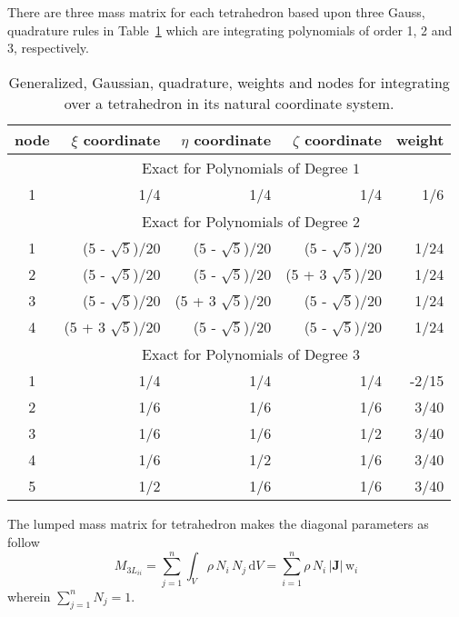 There are three mass matrix for each tetrahedron based upon three Gauss, quadrature rules in Table~\ref{tabQuadraturetetra} which are integrating polynomials of order 1, 2 and 3, respectively. 

\begin{table}
    \centering
    \begin{tabular}{|c|rrrr|}
        \hline
        node & \centering $\xi$ coordinate \phantom{1234}  & 
        $\eta$ coordinate \phantom{1234} & 
        $\zeta$ coordinate \phantom{1234} & weight \phantom{12345} \\ \hline        
        & \multicolumn{4}{|c|}{Exact for Polynomials of Degree $1^{\phantom{|^|}}$} \\ 
        \hline
        1 & 1/4 & 1/4 & 1/4 & 1/6 \\ 
        \hline
        & \multicolumn{4}{|c|}{Exact for Polynomials of Degree $2^{\phantom{|^|}}$} \\ \hline
        1 & (5 - $\sqrt{5}$)/20 & (5 - $\sqrt{5}$)/20 & (5 - $\sqrt{5}$)/20 & 1/24\\
        2 & (5 - $\sqrt{5}$)/20 & (5 - $\sqrt{5}$)/20 & (5 + 3 $\sqrt{5}$)/20 & 1/24\\
        3 & (5 - $\sqrt{5}$)/20 & (5 + 3 $\sqrt{5}$)/20 & (5 - $\sqrt{5}$)/20 & 1/24\\ 
        4 & (5 + 3 $\sqrt{5}$)/20 & (5 - $\sqrt{5}$)/20 & (5 - $\sqrt{5}$)/20 & 1/24\\ 
        \hline
        & \multicolumn{4}{|c|}{Exact for Polynomials of Degree $3^{\phantom{|^|}}$} \\ \hline
        1 & 1/4 & 1/4 & 1/4 & -2/15 \\
        2 & 1/6 & 1/6 & 1/6 & 3/40\\
        3 & 1/6 & 1/6 & 1/2 & 3/40\\ 
        4 & 1/6 & 1/2 & 1/6 & 3/40 \\
        5 & 1/2 & 1/6 & 1/6 & 3/40 \\
        \hline
    \end{tabular}
    \caption{Generalized, Gaussian, quadrature, weights and nodes  for integrating over a tetrahedron in its natural coordinate system.}
    \label{tabQuadraturetetra}
\end{table}


The lumped mass matrix for tetrahedron makes the diagonal parameters as follow
\begin{equation}
{M}_{3L_{ii}} = \sum_{j=1}^n \int_{V}  \rho \, N_i \, N_j \, \mathrm{d} V = \sum_{i=1}^n  \rho  \, N_i\, |\mathbf{J}| \, \mathrm{w}_i
\label{LumMass3D}
\end{equation}
wherein $\sum_{j=1}^n N_j = 1$. 

